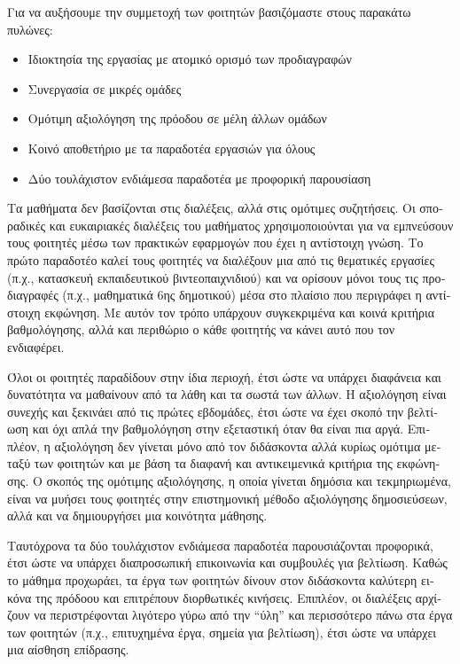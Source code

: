 \documentclass[11pt, a4paper]{article}
\providecommand{\tightlist}{%
  \setlength{\itemsep}{0pt}\setlength{\parskip}{0pt}}
\begin{document}
\begin{greek}
Για να αυξήσουμε την συμμετοχή των φοιτητών βασιζόμαστε στους παρακάτω
πυλώνες:

\begin{itemize}
\tightlist
\item
  Ιδιοκτησία της εργασίας με ατομικό ορισμό των προδιαγραφών
\item
  Συνεργασία σε μικρές ομάδες
\item
  Ομότιμη αξιολόγηση της πρόοδου σε μέλη άλλων ομάδων
\item
  Κοινό αποθετήριο με τα παραδοτέα εργασιών για όλους
\item
  Δύο τουλάχιστον ενδιάμεσα παραδοτέα με προφορική παρουσίαση
\end{itemize}

Τα μαθήματα δεν βασίζονται στις διαλέξεις, αλλά στις ομότιμες
συζητήσεις. Οι σποραδικές και ευκαιριακές διαλέξεις του μαθήματος
χρησιμοποιούνται για να εμπνεύσουν τους φοιτητές μέσω των πρακτικών
εφαρμογών που έχει η αντίστοιχη γνώση. Το πρώτο παραδοτέο καλεί τους
φοιτητές να διαλέξουν μια από τις θεματικές εργασίες (π.χ., κατασκευή
εκπαιδευτικού βιντεοπαιχνιδιού) και να ορίσουν μόνοι τους τις
προδιαγραφές (π.χ., μαθηματικά 6ης δημοτικού) μέσα στο πλαίσιο που
περιγράφει η αντίστοιχη εκφώνηση. Με αυτόν τον τρόπο υπάρχουν
συγκεκριμένα και κοινά κριτήρια βαθμολόγησης, αλλά και περιθώριο ο κάθε
φοιτητής να κάνει αυτό που τον ενδιαφέρει.

Όλοι οι φοιτητές παραδίδουν στην ίδια περιοχή, έτσι ώστε να υπάρχει
διαφάνεια και δυνατότητα να μαθαίνουν από τα λάθη και τα σωστά των
άλλων. Η αξιολόγηση είναι συνεχής και ξεκινάει από τις πρώτες εβδομάδες,
έτσι ώστε να έχει σκοπό την βελτίωση και όχι απλά την βαθμολόγηση στην
εξεταστική όταν θα είναι πια αργά. Επιπλέον, η αξιολόγηση δεν γίνεται
μόνο από τον διδάσκοντα αλλά κυρίως ομότιμα μεταξύ των φοιτητών και με
βάση τα διαφανή και αντικειμενικά κριτήρια της εκφώνησης. Ο σκοπός της
ομότιμης αξιολόγησης, η οποία γίνεται δημόσια και τεκμηριωμένα, είναι να
μυήσει τους φοιτητές στην επιστημονική μέθοδο αξιολόγησης δημοσιεύσεων,
αλλά και να δημιουργήσει μια κοινότητα μάθησης.

Ταυτόχρονα τα δύο τουλάχιστον ενδιάμεσα παραδοτέα παρουσιάζονται
προφορικά, έτσι ώστε να υπάρχει διαπροσωπική επικοινωνία και συμβουλές
για βελτίωση. Καθώς το μάθημα προχωράει, τα έργα των φοιτητών δίνουν
στον διδάσκοντα καλύτερη εικόνα της πρόδοου και επιτρέπουν διορθωτικές
κινήσεις. Επιπλέον, οι διαλέξεις αρχίζουν να περιστρέφονται λιγότερο
γύρω από την ``ύλη'' και περισσότερο πάνω στα έργα των φοιτητών (π.χ.,
επιτυχημένα έργα, σημεία για βελτίωση), έτσι ώστε να υπάρχει μια αίσθηση
επίδρασης.


\end{greek}
\end{document}
